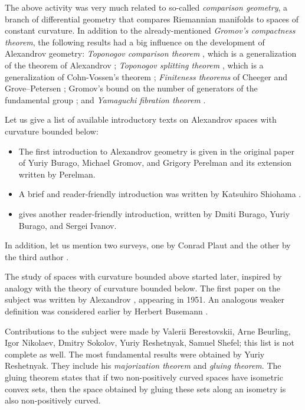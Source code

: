 The above activity was very much related to so-called {}\emph{comparison geometry},
a branch of differential geometry that compares Riemannian manifolds  to  spaces of constant curvature.
In addition to the already-mentioned {}\emph{Gromov's compactness theorem},
the following results had a big influence on the development of Alexandrov geometry:
{}\emph{Toponogov comparison theorem} \cite{toponogov-globalization+splitting}, which is a generalization of the theorem of Alexandrov \cite{alexandrov-comparison};
{}\emph{Toponogov splitting theorem} \cite{toponogov-globalization+splitting}, which is a generalization of Cohn-Vossen's theorem \cite{cohn-vossen_line};
{}\emph{Finiteness theorems} of
Cheeger
and
Grove--Petersen \cite{cheeger-finiteness,grove-petersen:finiteness};
Gromov's bound on the number of generators of the fundamental group 
\cite[1.5]{gromov:almost-flat};
and 
{}\emph{Yamaguchi fibration theorem} \cite{yamaguchi-fibration}.

%
Let us give a list of available introductory texts on Alexandrov spaces with curvature bounded below: 
\begin{itemize}
\item The first introduction to Alexandrov geometry is given in the original paper of Yuriy Burago, Michael Gromov, and Grigory Perelman \cite{burago-gromov-perelman} 
and its extension \cite{perelman:spaces2} written by Perelman.
\item A brief and reader-friendly introduction was written by Katsuhiro Shiohama \cite[Sections 1--8]{shiohama}.
\item \cite[Chapter 10]{burago-burago-ivanov} gives another reader-friendly introduction, written by Dmiti Burago, Yuriy Burago, and Sergei Ivanov.
\end{itemize}
In addition, let us mention two surveys, one by Conrad Plaut \cite{plaut:survey} and the other by the third author \cite{petrunin:survey}.

{\sloppy

The study of  spaces with curvature bounded above started later,
inspired by analogy with the theory of curvature bounded below.
The first paper on the subject was written by Alexandrov \cite{alexandrov:strong-angle}, appearing in 1951.
An analogous weaker definition was considered earlier by Herbert Busemann \cite{busemann-CBA}.

}

Contributions to the subject were made by
Valerii Berestovskii, 
Arne Beurling, 
Igor Nikolaev,
Dmitry Sokolov,
Yuriy Reshetnyak,
Samuel Shefel; this list is not complete as well.
The most fundamental results were obtained by Yuriy Reshetnyak.
They include his {}\emph{majorization theorem} and {}\emph{gluing theorem}.
The gluing theorem states that if two non-positively curved spaces have isometric convex sets, then the space obtained by gluing these sets along an isometry is also non-positively curved.

